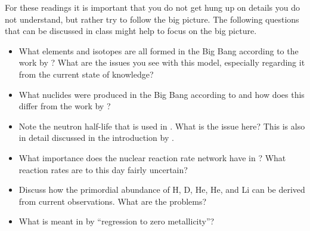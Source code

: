 For these readings it is important that you do not get hung up on details you do not understand, but rather try to follow the big picture. The following questions that can be discussed in class might help to focus on the big picture.

\begin{itemize}
    \item What elements and isotopes are all formed in the Big Bang according to the work by \citet{alpher48}? What are the issues you see with this model, especially regarding it from the current state of knowledge?
    \item What nuclides were produced in the Big Bang according to \citet{peebles66prl} and how does this differ from the work by \citet{alpher48}?
    \item Note the neutron half-life that is used in \citet{peebles66prl}. What is the issue here? This is also in detail discussed in the introduction by \citet{cyburt16}.
    \item What importance does the nuclear reaction rate network have in \citet{cyburt16}? What reaction rates are to this day fairly uncertain?
    \item Discuss how the primordial abundance of H, D, He, He, and Li can be derived from current observations. What are the problems?
    \item What is meant in \citet{cyburt16} by ``regression to zero metallicity''?
\end{itemize}